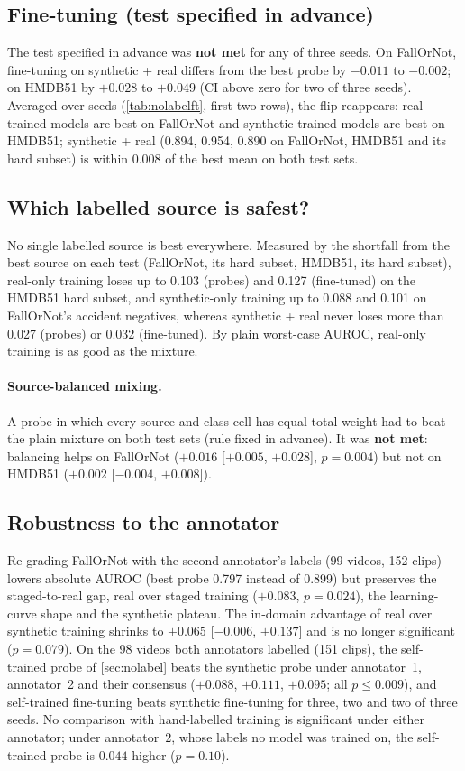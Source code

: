 \documentclass[10pt,twocolumn,letterpaper]{article}
\begin{document}
\subsection{Fine-tuning (test specified in advance)}
The test specified in advance was \textbf{not met} for any of three seeds. On FallOrNot, fine-tuning on synthetic + real differs from the best probe by $-0.011$ to $-0.002$; on HMDB51 by $+0.028$ to $+0.049$ (CI above zero for two of three seeds). Averaged over seeds (\cref{tab:nolabelft}, first two rows), the flip reappears: real-trained models are best on FallOrNot and synthetic-trained models are best on HMDB51; synthetic + real (0.894, 0.954, 0.890 on FallOrNot, HMDB51 and its hard subset) is within 0.008 of the best mean on both test sets.

\subsection{Which labelled source is safest?}
No single labelled source is best everywhere. Measured by the shortfall from the best source on each test (FallOrNot, its hard subset, HMDB51, its hard subset), real-only training loses up to 0.103 (probes) and 0.127 (fine-tuned) on the HMDB51 hard subset, and synthetic-only training up to 0.088 and 0.101 on FallOrNot's accident negatives, whereas synthetic + real never loses more than 0.027 (probes) or 0.032 (fine-tuned). By plain worst-case AUROC, real-only training is as good as the mixture.

\paragraph{Source-balanced mixing.} A probe in which every source-and-class cell has equal total weight had to beat the plain mixture on both test sets (rule fixed in advance). It was \textbf{not met}: balancing helps on FallOrNot ($+0.016$ [$+0.005$, $+0.028$], $p=0.004$) but not on HMDB51 ($+0.002$ [$-0.004$, $+0.008$]).

\subsection{Robustness to the annotator}\label{sec:annotator}
Re-grading FallOrNot with the second annotator's labels (99 videos, 152 clips) lowers absolute AUROC (best probe 0.797 instead of 0.899) but preserves the staged-to-real gap, real over staged training ($+0.083$, $p=0.024$), the learning-curve shape and the synthetic plateau. The in-domain advantage of real over synthetic training shrinks to $+0.065$ [$-0.006$, $+0.137$] and is no longer significant ($p=0.079$). On the 98 videos both annotators labelled (151 clips), the self-trained probe of \cref{sec:nolabel} beats the synthetic probe under annotator~1, annotator~2 and their consensus ($+0.088$, $+0.111$, $+0.095$; all $p\le0.009$), and self-trained fine-tuning beats synthetic fine-tuning for three, two and two of three seeds. No comparison with hand-labelled training is significant under either annotator; under annotator~2, whose labels no model was trained on, the self-trained probe is $0.044$ higher ($p=0.10$).
\end{document}
